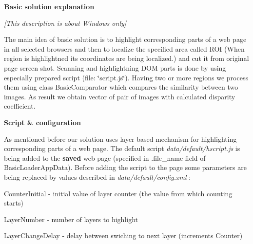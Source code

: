 \par
 {\bfseries Basic solution explanation}\par
 {\itshape \mbox{[}This description is about Windows only\mbox{]}}\par
 The main idea of basic solution is to highlight corresponding parts of a web page in all selected browsers and then to localize the specified area called R\-O\-I (When region is highlightned its coordinates are being localized.) and cut it from original page screen shot. Scanning and highlightning D\-O\-M parts is done by using especially prepared script (file\-: \char`\"{}script.\-js\char`\"{}). Having two or more regions we process them using class Basic\-Comparator which compares the similarity between two images. As result we obtain vector of pair of images with calculated disparity coefficient. \par
\par
 {\bfseries Script \& configuration}\par
\par
 As mentioned before our solution uses layer based mechanism for highlighting corresponding parts of a web page. The default script {\itshape data/default/hscript.\-js} is being added to the {\bfseries saved} web page (specified in .file\-\_\-name field of Basic\-Loader\-App\-Data). Before adding the script to the page some parameters are being replaced by values described in {\itshape data/default/config.\-xml} \-: \par
 
\begin{DoxyItemize}
\item Counter\-Initial -\/ initial value of layer counter (the value from which counting starts) 
\item Layer\-Number -\/ number of layers to highlight 
\item Layer\-Change\-Delay -\/ delay between swiching to next layer (increments Counter) 
\end{DoxyItemize}

